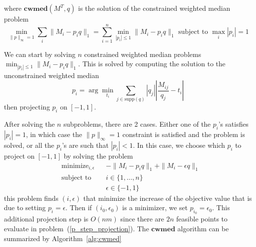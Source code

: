 where $\mathbf{cwmed}(M^T, q)$ is the solution of the constrained weighted median problem
\[
\min_{\|p\|_\infty = 1} \sum_{i} \|M_i - p_i q\|_1 = \sum_{i = 1}^n \min_{|p_i| \leq 1} \|M_i - p_i q\|_1 \text{ subject to } \max_i |p_i| = 1
\]

  

We can start by solving $n$ constrained weighted median problems $\min_{|p_i| \leq 1} \|M_i - p_i q\|_1$. This is solved by computing the solution to the unconstrained weighted median 
\[
p_i = \arg \min_{t_i} \sum_{j \in \text{supp}(q)} |q_j| \left| \frac{M_{ij}}{q_j} - t_i \right|
\]
then projecting $p_i$ on $[-1, 1]$.

After solving the $n$ subproblems, there are 2 cases. Either one of the $p_i$'s satisfies $|p_i| = 1$, in which case the $\|p\|_\infty = 1$ constraint is satisfied and the problem is solved, or all the $p_i$'s are such that $|p_i| < 1$. In this case, we choose which $p_i$ to project on $[-1, 1]$ by solving the problem
\begin{equation}
\label{p_step_projection}
\begin{aligned}
&\text{minimize}_{i,\epsilon} && -\|M_i - p_i q\|_1 + \|M_i - \epsilon q\|_1 \\
& \text{subject to} 
&& i \in \{1, \dots, n\} \\
&&& \epsilon \in \{-1, 1\}
\end{aligned}
\end{equation}
this problem finds $(i, \epsilon)$ that minimize the increase of the objective value that is due to setting $p_i = \epsilon$. Then if $(i_0, \epsilon_0)$ is a minimizer, we set $p_{i_0} = \epsilon_0$. This additional projection step is $O(nm)$ since there are $2n$ feasible points to evaluate in problem~(\ref{p_step_projection}). The $\mathbf{cwmed}$ algorithm can be summarized by Algorithm~\ref{alg:cwmed}

\begin{algorithm}[h]
\caption{$\mathbf{p = cwmed}(M^T,q)$}
\label{alg:cwmed}
\end{algorithm}


